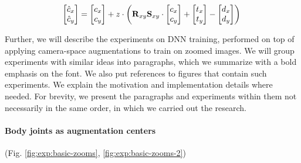 \begin{equation}
	\begin{bmatrix} 
		\hat{c}_x \\ 
		\hat{c}_y \\
	\end{bmatrix} = \begin{bmatrix} 
		c_x \\ 
		c_y \\
	\end{bmatrix} + 
	z \cdot \left(
		\bm{\mathrm{R}}_{xy} \bm{\mathrm{S}}_{xy} \cdot \begin{bmatrix} 
			c_x \\ 
			c_y \\
		\end{bmatrix} + \begin{bmatrix} 
			t_x\\ 
			t_y\\
		\end{bmatrix}
		- \begin{bmatrix} 
			d_x\\ 
			d_y\\
		\end{bmatrix}
	\right)
	\label{methods:eq:cam-aug-shift-center}\\
\end{equation}

Further, we will describe the experiments on DNN training, performed on top of applying camera-space augmentations to train on zoomed images. We will group experiments with similar ideas into paragraphs, which we summarize with a bold emphasis on the font. We also put references to figures that contain such experiments. We explain the motivation and implementation details where needed. For brevity, we present the paragraphs and experiments within them not necessarily in the same order, in which we carried out the research.

\vspace{-15pt}\paragraph{Body joints as augmentation centers}(Fig. \ref{fig:exp:basic-zooms}, \ref{fig:exp:basic-zooms-2})\mbox{}\nopagebreak

